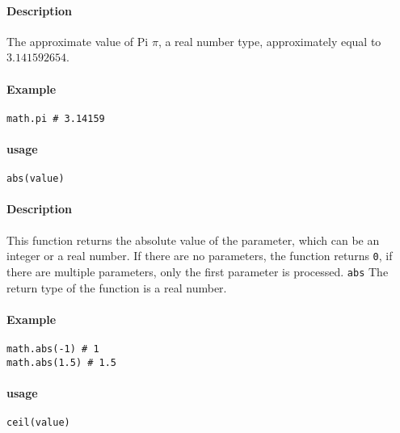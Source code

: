 
\paragraph{Description}
The approximate value of Pi $\pi$, a real number type, approximately equal to $3.141592654$.

\paragraph{Example}
\begin{lstlisting}[language=berry, numbers=none]
math.pi # 3.14159
\end{lstlisting}


\paragraph{usage}
\begin{lstlisting}[language=berry, numbers=none]
abs(value)
\end{lstlisting}

\paragraph{Description}
This function returns the absolute value of the parameter, which can be an integer or a real number. If there are no parameters, the function returns \texttt{0}, if there are multiple parameters, only the first parameter is processed. \texttt{abs} The return type of the function is a real number.

\paragraph{Example}
\begin{lstlisting}[language=berry, numbers=none]
math.abs(-1) # 1
math.abs(1.5) # 1.5
\end{lstlisting}


\paragraph{usage}
\begin{lstlisting}[language=berry, numbers=none]
ceil(value)
\end{lstlisting}

